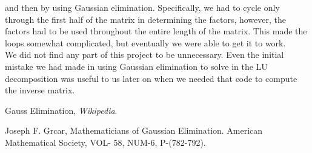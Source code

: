 \documentclass[a4paper, 10pt]{article}
\begin{document}
\noindent and then by using Gaussian elimination.  Specifically, we had to cycle only through the first half of the matrix in determining the factors, however, the factors had to be used throughout the entire length of the matrix.  This made the loops somewhat complicated, but eventually we were able to get it to work.\\

\noindent We did not find any part of this project to be unnecessary.  Even the initial mistake we had made in using Gaussian elimination to solve in the LU decomposition was useful to us later on when we needed that code to compute the inverse matrix.\\


       




\begin{thebibliography}{1}


Gauss Elimination, \emph{Wikipedia}. 

Joseph F. Grcar, Mathematicians of
Gaussian Elimination. American Mathematical Society, VOL- 58, NUM-6, P-(782-792).




\end{thebibliography}
\end{document}
